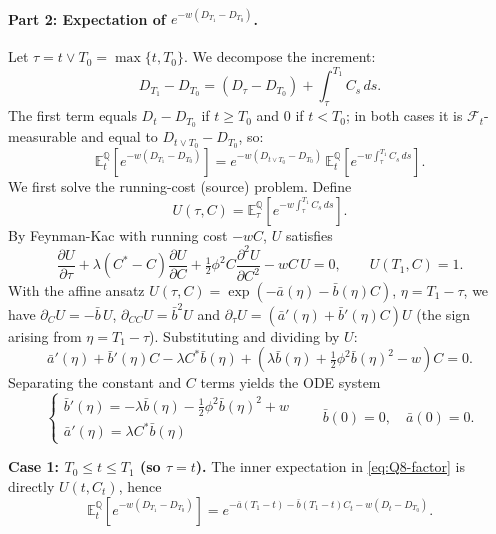 \documentclass[12pt,a4paper]{article}
\begin{document}
\paragraph{Part 2: Expectation of $e^{-w(D_{T_1} - D_{T_0})}$.}
Let $\tau = t \vee T_0 = \max\{t,T_0\}$. We decompose the increment:
\[
D_{T_1} - D_{T_0}
=
(D_\tau - D_{T_0}) + \int_\tau^{T_1} C_s\,ds.
\]
The first term equals $D_t - D_{T_0}$ if $t \ge T_0$ and $0$ if $t < T_0$; in both cases it is $\mathcal{F}_t$-measurable and equal to $D_{t\vee T_0} - D_{T_0}$, so:
\begin{equation}
\mathbb{E}^{\mathbb{Q}}_t\!\left[e^{-w(D_{T_1} - D_{T_0})}\right]
=
e^{-w(D_{t\vee T_0} - D_{T_0})}
\,
\mathbb{E}^{\mathbb{Q}}_t\!\left[e^{-w\int_\tau^{T_1} C_s\,ds}\right]. \label{eq:Q8-factor}
\end{equation}
We first solve the running-cost (source) problem. Define
\[
U(\tau, C)
=
\mathbb{E}^{\mathbb{Q}}_\tau\!\left[e^{-w\int_\tau^{T_1} C_s\,ds}\right].
\]
By Feynman-Kac with running cost $-wC$, $U$ satisfies
\begin{equation*}
\frac{\partial U}{\partial \tau}
+ \lambda(C^* - C)\frac{\partial U}{\partial C}
+ \tfrac{1}{2}\phi^2 C \frac{\partial^2 U}{\partial C^2}
- wC\,U
= 0,
\qquad
U(T_1, C) = 1.
\end{equation*}
With the affine ansatz $U(\tau,C) = \exp(-\bar a(\eta) - \bar b(\eta)C)$, $\eta = T_1 - \tau$, we have $\partial_C U = -\bar b\,U$, $\partial_{CC} U = \bar b^2 U$ and $\partial_\tau U = (\bar a'(\eta) + \bar b'(\eta)C)U$ (the sign arising from $\eta = T_1-\tau$). Substituting and dividing by $U$:
\[
\bar a'(\eta) + \bar b'(\eta)C - \lambda C^* \bar b(\eta) + \left(\lambda \bar b(\eta) + \tfrac{1}{2}\phi^2 \bar b(\eta)^2 - w\right)C = 0.
\]
Separating the constant and $C$ terms yields the ODE system
\begin{equation*}
\boxed{
\begin{cases}
\bar b'(\eta) = -\lambda \bar b(\eta) - \tfrac{1}{2}\phi^2 \bar b(\eta)^2 + w \\
\bar a'(\eta) = \lambda C^* \bar b(\eta)
\end{cases}
}
\qquad \bar b(0)=0, \quad \bar a(0)=0.
\end{equation*}

\noindent\textbf{Case 1: $T_0 \le t \le T_1$ (so $\tau = t$).} The inner expectation in \eqref{eq:Q8-factor} is directly $U(t,C_t)$, hence
\begin{equation*}
\mathbb{E}^{\mathbb{Q}}_t\!\left[e^{-w(D_{T_1} - D_{T_0})}\right]
= e^{-\bar a(T_1-t) - \bar b(T_1-t)C_t - w(D_t - D_{T_0})}.
\end{equation*}
\end{document}
